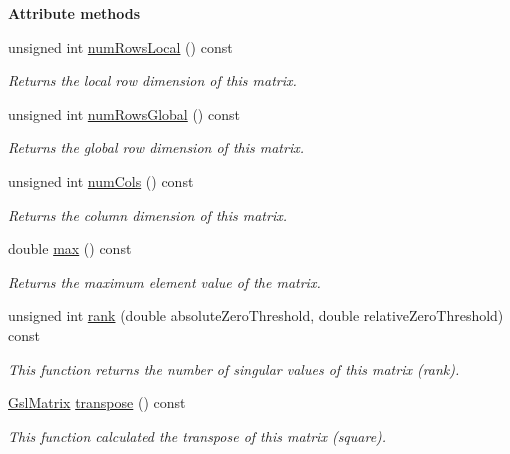 \begin{Indent}{\bf Attribute methods}\par
\begin{DoxyCompactItemize}
\item 
unsigned int \hyperlink{class_q_u_e_s_o_1_1_gsl_matrix_ab5ec937a9fd439eef1a87e12c0dbccb4}{num\-Rows\-Local} () const 
\begin{DoxyCompactList}\small\item\em Returns the local row dimension of {\ttfamily this} matrix. \end{DoxyCompactList}\item 
unsigned int \hyperlink{class_q_u_e_s_o_1_1_gsl_matrix_ac97f38374fae17c60dd508f0a246496a}{num\-Rows\-Global} () const 
\begin{DoxyCompactList}\small\item\em Returns the global row dimension of {\ttfamily this} matrix. \end{DoxyCompactList}\item 
unsigned int \hyperlink{class_q_u_e_s_o_1_1_gsl_matrix_ad5005f168fe030468e834776afb1859b}{num\-Cols} () const 
\begin{DoxyCompactList}\small\item\em Returns the column dimension of {\ttfamily this} matrix. \end{DoxyCompactList}\item 
double \hyperlink{class_q_u_e_s_o_1_1_gsl_matrix_a3ba4b92584badaac17274ce9aadb2651}{max} () const 
\begin{DoxyCompactList}\small\item\em Returns the maximum element value of the matrix. \end{DoxyCompactList}\item 
unsigned int \hyperlink{class_q_u_e_s_o_1_1_gsl_matrix_a244f52561496792a9fb564d5a4f0f7b0}{rank} (double absolute\-Zero\-Threshold, double relative\-Zero\-Threshold) const 
\begin{DoxyCompactList}\small\item\em This function returns the number of singular values of {\ttfamily this} matrix (rank). \end{DoxyCompactList}\item 
\hyperlink{class_q_u_e_s_o_1_1_gsl_matrix}{Gsl\-Matrix} \hyperlink{class_q_u_e_s_o_1_1_gsl_matrix_af5507bf0618d3bcc57abc13110c2630d}{transpose} () const 
\begin{DoxyCompactList}\small\item\em This function calculated the transpose of {\ttfamily this} matrix (square). \end{DoxyCompactList}\item 

\end{DoxyCompactItemize}
\end{Indent}

